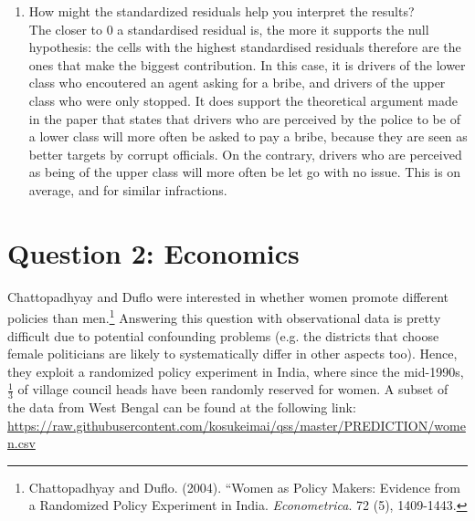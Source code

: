 \documentclass[12pt,letterpaper]{article}
\begin{document}
\begin{enumerate}
\begin{table}[h]
\begin{tabular}{l | c c c }
			\end{tabular}
		\end{table}
		
		
		\vspace{1cm}
		\item [(d)] How might the standardized residuals help you interpret the results?  \\
		The closer to 0 a standardised residual is, the more it supports the null hypothesis: the cells with the highest standardised residuals therefore are the ones that make the biggest contribution. In this case, it is drivers of the lower class who encoutered an agent asking for a bribe, and drivers of the upper class who were only stopped. It does support the theoretical argument made in the paper that states that drivers who are perceived by the police to be of a lower class will more often be asked to pay a bribe, because they are seen as better targets by corrupt officials. On the contrary, drivers who are perceived as being of the upper class will more often be let go with no issue. This is on average, and for similar infractions.
		
	\end{enumerate}
	\newpage
	
	\section*{Question 2: Economics}
	Chattopadhyay and Duflo were interested in whether women promote different policies than men.\footnote{Chattopadhyay and Duflo. (2004). ``Women as Policy Makers: Evidence from a Randomized Policy Experiment in India. \textit{Econometrica}. 72 (5), 1409-1443.} Answering this question with observational data is pretty difficult due to potential confounding problems (e.g. the districts that choose female politicians are likely to systematically differ in other aspects too). Hence, they exploit a randomized policy experiment in India, where since the mid-1990s, $\frac{1}{3}$ of village council heads have been randomly reserved for women. A subset of the data from West Bengal can be found at the following link: \url{https://raw.githubusercontent.com/kosukeimai/qss/master/PREDICTION/women.csv}\\
	
\end{document}
